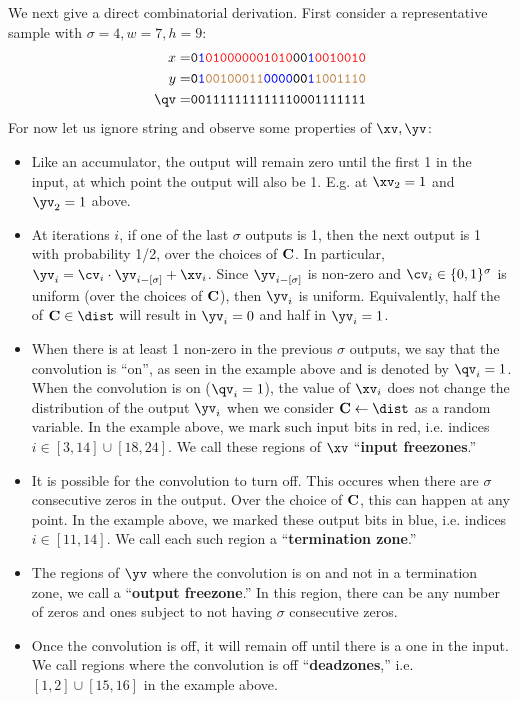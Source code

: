 We next give a direct combinatorial derivation.  First consider a representative
sample with $\sigma=4,w=7,h=9$:
\begin{align*}
    x= & \texttt{0\textcolor{blue}{1}\textcolor{red}{010000001010}00\textcolor{blue}{1}\textcolor{red}{0010010}}\\
    y= & \texttt{0\textcolor{blue}{1}\textcolor{brown}{00100011}\textcolor{blue}{0000}00\textcolor{blue}{1}\textcolor{brown}{1001110}}\\
    \qv= & \texttt{001111111111110001111111}
\end{align*}
For now let us ignore \qv string and observe some properties of $\xv,\yv$:
\begin{itemize}
    \item Like an accumulator, the output will remain zero until the first 1 in the input, at which point the output will also be 1. E.g. at $\xv_2=1$ and $\yv_2=1$ above.
    \item At iterations $i$, if one of the last $\sigma$ outputs is 1, then the next output is 1 with probability 1/2, over the choices of $\mathbf C$. In particular,
    $\yv_i=\cv_i\cdot \yv_{i-[\sigma]} + \xv_i$. Since $\yv_{i-[\sigma]}$ is non-zero and $\cv_i\in\{0,1\}^\sigma$ is uniform (over the choices of $\mathbf C$), then $\yv_i$ is uniform. Equivalently, half the of $\C\in \dist$ will result in $\yv_i=0$ and half in $\yv_i=1$.
    \item When there is at least 1 non-zero in the previous $\sigma$ outputs, we say that the convolution is ``on'', as seen in the example above and is denoted by $\qv_i=1$. When the convolution is on ($\qv_i=1$), the value of $\xv_i$ does not change the distribution of the output $\yv_i$ when we consider $\C\gets \dist$ as a random variable. In the example above, we mark such input bits in red, i.e. indices $i\in [3,14]\cup [18,24]$. We call these regions of $\xv$ ``\textbf{input freezones}.''
    
    \item It is possible for the convolution to turn off. This occures when there are $\sigma$ consecutive zeros in the output. Over the choice of $\mathbf C$, this can happen at any point. In the example above, we marked these output bits in blue, i.e. indices $i\in [11,14]$. We call each such region a ``\textbf{termination zone}.''

    \item The regions of $\yv$ where the convolution is on and not in a termination zone, we call a ``\textbf{output freezone}.'' In this region, there can be any number of zeros and ones subject to not having $\sigma$ consecutive zeros. 

    \item Once the convolution is off, it will remain off until there is a one in the input. We call regions where the convolution is off ``\textbf{deadzones},'' i.e. $[1,2]\cup[15,16]$ in the example above.
\end{itemize}

